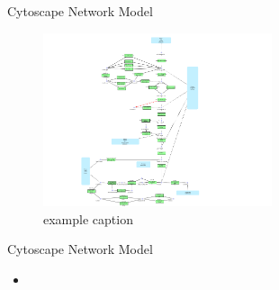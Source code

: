 \begin{frame}{Cytoscape Network Model}
	\begin{figure}[htbp]
	   \centering
	   \includegraphics[width=0.6\textwidth]{data/Graph/GlycoGraph}
	   \caption{example caption}
	   \label{fig:example}
	\end{figure}
\end{frame}

\begin{frame}{Cytoscape Network Model}
	\begin{itemize}
		\item {}
	\end{itemize}
\end{frame}

